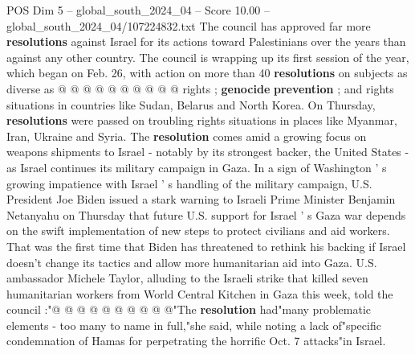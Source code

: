 \begin{textsample}{POS Dim 5 – global\_south\_2024\_04 – Score 10.00 – global\_south\_2024\_04/107224832.txt}
The council has approved far more \textbf{resolutions} against Israel for its actions toward Palestinians over the years than against any other country.
The council is wrapping up its first session of the year, which began on Feb. 26, with action on more than 40 \textbf{resolutions} on subjects as diverse as @ @ @ @ @ @ @ @ @ @ rights ; \textbf{genocide} \textbf{prevention} ; and rights situations in countries like Sudan, Belarus and North Korea.
On Thursday, \textbf{resolutions} were passed on troubling rights situations in places like Myanmar, Iran, Ukraine and Syria.
The \textbf{resolution} comes amid a growing focus on weapons shipments to Israel - notably by its strongest backer, the United States - as Israel continues its military campaign in Gaza.
In a sign of Washington ' s growing impatience with Israel ' s handling of the military campaign, U.S.
President Joe Biden issued a stark warning to Israeli Prime Minister Benjamin Netanyahu on Thursday that future U.S. support for Israel ' s Gaza war depends on the swift implementation of new steps to protect civilians and aid workers.
That was the first time that Biden has threatened to rethink his backing if Israel doesn't change its tactics and allow more humanitarian aid into Gaza.
U.S. ambassador Michele Taylor, alluding to the Israeli strike that killed seven humanitarian workers from World Central Kitchen in Gaza this week, told the council :"@ @ @ @ @ @ @ @ @ @"The \textbf{resolution} had"many problematic elements - too many to name in full,"she said, while noting a lack of"specific condemnation of Hamas for perpetrating the horrific Oct. 7 attacks"in Israel.

\end{textsample}
